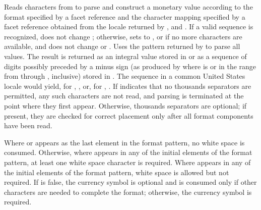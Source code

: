 \begin{itemdescr}
\pnum
\effects
Reads characters from
to parse and construct a monetary value according to the
format specified by a
facet reference
and the character mapping specified by a
facet reference
obtained from the locale returned by
,
and
.
If a valid sequence is recognized,
does not change ;
otherwise, sets  to
,
or
if no more characters are available,
and does not change  or .
Uses the pattern returned by
to parse all values.
The result is returned as an integral value stored in
or as a sequence of digits possibly preceded by a minus sign
(as produced by
where
is
or in the range from
through
,
inclusive)
stored in
.
\enterexample
The sequence
in a common United States locale would yield, for
,
,
or, for
,
.
\exitexample
If
indicates that no thousands separators are permitted,
any such characters are not read, and parsing is terminated at the point
where they first appear.
Otherwise, thousands separators are optional;
if present, they are checked for correct placement only after
all format components have been read.

\pnum
Where
or
appears as the last element in the format pattern,
no white space is consumed. Otherwise, where  appears in any of the
initial elements of the format pattern, at least one white space character is required. Where
 appears in any of the initial elements of the format pattern, white
space is allowed but not required.
If
is false, the currency symbol is optional and is consumed only if
other characters are needed to complete the format;
otherwise, the currency symbol is required.


\end{itemdescr}

